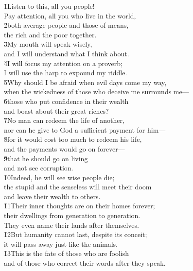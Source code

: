\begin{poetry}
\poeml \v{1}Listen to this, all you people! \\
\poemll    Pay attention, all you who live in the world, \\
\poeml \v{2}both average people and those of means, \\
\poemll    the rich and the poor together. \\
\poeml \v{3}My mouth will speak wisely, \\
\poemll    and I will understand what I think about. \\
\poeml \v{4}I will focus my attention on a proverb; \\
\poemll    I will use the harp to expound my riddle. \\
\poeml \v{5}Why should I be afraid when evil days come my way, \\
\poemll    when the wickedness of those who deceive me surrounds me--- \\
\poeml \v{6}those who put confidence in their wealth \\
\poemll    and boast about their great riches? \\
\poeml \v{7}No man can redeem the life of another, \\
\poemll    nor can he give to God a sufficient payment for him--- \\
\poeml \v{8}for it would cost too much to redeem his life, \\
\poemll    and the payments would go on forever--- \\
\poeml \v{9}that he should go on living \\
\poemll    and not see corruption. \\
\poeml \v{10}Indeed, he will see wise people die; \\
\poemll    the stupid and the senseless will meet their doom \\
\poemlll       and leave their wealth to others. \\
\poeml \v{11}Their inner thoughts are on their homes forever; \\
\poemll    their dwellings from generation to generation. \\
\poemlll       They even name their lands after themselves. \\
\poeml \v{12}But humanity cannot last, despite its conceit; \\
\poemll    it will pass away just like the animals. \\
\poeml \v{13}This is the fate of those who are foolish \\
\poemll    and of those who correct their words after they speak.
\end{poetry}
